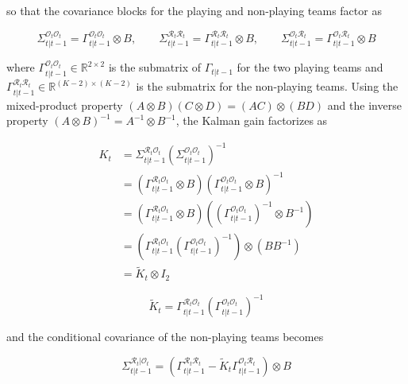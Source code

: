 so that the covariance blocks for the playing and non-playing teams factor as

\begin{equation}
    \Sigma_{t|t-1}^{\mathcal{O}_t\mathcal{O}_t} = \Gamma^{\mathcal{O}_t\mathcal{O}_t}_{t|t-1} \otimes B, \qquad
    \Sigma_{t|t-1}^{\mathcal{R}_t\mathcal{R}_t} = \Gamma^{\mathcal{R}_t\mathcal{R}_t}_{t|t-1} \otimes B, \qquad
    \Sigma_{t|t-1}^{\mathcal{O}_t\mathcal{R}_t} = \Gamma^{\mathcal{O}_t\mathcal{R}_t}_{t|t-1} \otimes B \nonumber
\end{equation}

where $\Gamma^{\mathcal{O}_t\mathcal{O}_t}_{t|t-1} \in \mathbb{R}^{2 \times 2}$ is the submatrix of $\Gamma_{t|t-1}$ for the two playing teams and $\Gamma^{\mathcal{R}_t\mathcal{R}_t}_{t|t-1} \in \mathbb{R}^{(K-2) \times (K-2)}$ is the submatrix for the non-playing teams. Using the mixed-product property $(A \otimes B)(C \otimes D) = (AC) \otimes (BD)$ and the inverse property $(A \otimes B)^{-1} = A^{-1} \otimes B^{-1}$, the Kalman gain factorizes as

\begin{align}
    K_t &= \Sigma_{t|t-1}^{\mathcal{R}_t\mathcal{O}_t} \left( \Sigma_{t|t-1}^{\mathcal{O}_t\mathcal{O}_t} \right)^{-1} \nonumber \\
    &= \left( \Gamma^{\mathcal{R}_t\mathcal{O}_t}_{t|t-1} \otimes B \right) \left( \Gamma^{\mathcal{O}_t\mathcal{O}_t}_{t|t-1} \otimes B \right)^{-1} \nonumber \\
    &= \left( \Gamma^{\mathcal{R}_t\mathcal{O}_t}_{t|t-1} \otimes B \right) \left( (\Gamma^{\mathcal{O}_t\mathcal{O}_t}_{t|t-1})^{-1} \otimes B^{-1} \right) \nonumber \\
    &= \left( \Gamma^{\mathcal{R}_t\mathcal{O}_t}_{t|t-1} (\Gamma^{\mathcal{O}_t\mathcal{O}_t}_{t|t-1})^{-1} \right) \otimes \left( B B^{-1} \right) \nonumber \\
    &= \tilde{K}_t \otimes I_2 \nonumber
\end{align}

\begin{equation}
    \tilde{K}_t = \Gamma^{\mathcal{R}_t\mathcal{O}_t}_{t|t-1} (\Gamma^{\mathcal{O}_t\mathcal{O}_t}_{t|t-1})^{-1} \nonumber
\end{equation}

and the conditional covariance of the non-playing teams becomes

\begin{equation}
    \Sigma_{t|t-1}^{\mathcal{R}_t|\mathcal{O}_t} = \left( \Gamma^{\mathcal{R}_t\mathcal{R}_t}_{t|t-1} - \tilde{K}_t \Gamma^{\mathcal{O}_t\mathcal{R}_t}_{t|t-1} \right) \otimes B \nonumber
\end{equation}


